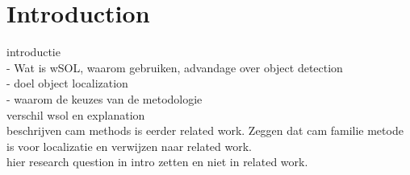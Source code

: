 \chapter{Introduction}

introductie\\
- Wat is wSOL, waarom gebruiken, advandage over object detection\\
- doel object localization\\
- waarom de keuzes van de metodologie\\
verschil wsol en explanation\\
beschrijven cam methods is eerder related work. Zeggen dat cam familie metode is voor localizatie en verwijzen naar related work.\\
hier research question in intro zetten en niet in related work.\\

